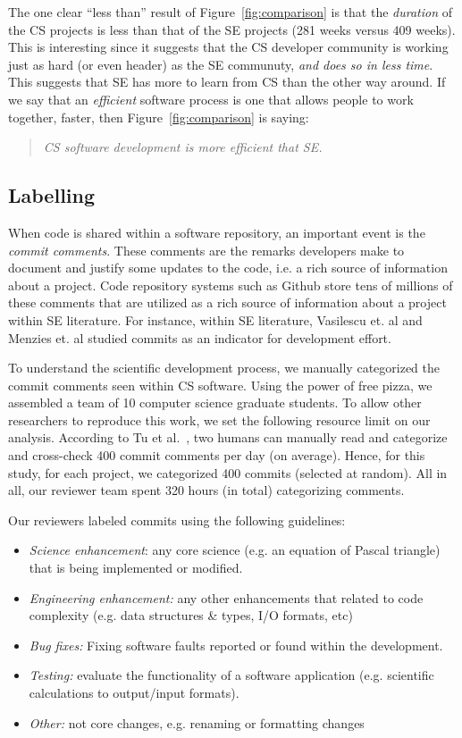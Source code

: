 \documentclass[sigconf,review,anonymous]{acmart}
\newcommand{\bi}{\begin{itemize}}
\newcommand{\ei}{\end{itemize}}
\begin{document}
The one clear ``less than'' result of Figure~\ref{fig:comparison} is that the {\em duration} of the CS projects is less than that of the SE projects (281 weeks versus 409 weeks). 
This is interesting since it suggests
that the CS developer community is working
just as hard (or even header)
as the SE communuty, {\em and does so in less time}.
This suggests that SE has more to learn from CS than the other way around.
If we say that   an {\em efficient} software process is one that allows  people to work together, faster,  then 
Figure~\ref{fig:comparison} is saying:
\begin{quote}
{\em CS software development is  more efficient that SE.}
\end{quote} 

     
 \subsection{Labelling}
 When code is shared
within a software repository, an important event is the {\em commit comments}. These comments are the remarks developers make to document and justify some updates to the code, i.e. a rich source of information about a project. Code repository systems such as Github store tens of millions of these comments that are utilized as a rich source of information about a project within SE literature. For instance, within SE literature,  Vasilescu et. al \cite{vasilescu16_limit} and Menzies et. al \cite{xia2019sequential} studied commits as an indicator for development effort.


To understand the scientific development process, we manually categorized the commit comments seen within CS
software. 
Using the power of free pizza, we assembled a team of 10 computer science 
graduate students.
To allow other researchers to reproduce this work, we set
the following
resource limit on our analysis.
According to Tu et al.~\cite{tu2019better}, two humans can manually read and categorize
and cross-check 400 commit comments per day (on average).
Hence, for this study, for each project, we categorized 400 commits
(selected at random). 
All in all, our
reviewer team spent 320 hours (in total) categorizing comments.



 Our  reviewers
labeled commits using the following
guidelines:
\bi
\item {\em Science enhancement}: any core science (e.g. an equation of Pascal triangle) that is being implemented or modified.
\item {\em Engineering enhancement:} any other enhancements that related to code complexity (e.g. data structures \& types, I/O formats, etc) 
\item {\em Bug fixes:} Fixing software faults reported or found within the development. 
\item {\em Testing: } evaluate the functionality of a software application (e.g. scientific calculations to output/input formats).
\item
{\em Other:} not core changes, e.g. renaming or formatting changes
\ei
\end{document}
